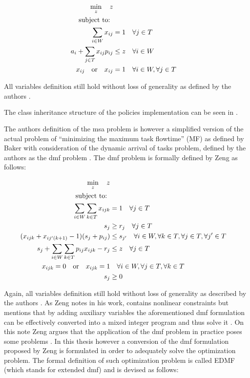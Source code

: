 \documentclass{seal_thesis}
\begin{document}
\begin{align}
    \min_z \quad z\\
    \text{subject to: } \notag \\
    \sum_{i \in W} x_{ij} &= 1 \quad \forall j \in T\\
    a_i + \sum_{j \in T} x_{ij} p_{ij} &\leq z \quad \forall i \in W\\
    x_{ij} \quad \text{or} \quad x_{ij}&=1 \quad \forall i \in W, \forall j \in T
\end{align}

All variables definition still hold without loss of generality as defined by the authors \cite[pp. 5-7]{Zeng2005}.

The class inheritance structure of the policies implementation can be seen in .


The authors definition of the \gls{msa} problem is however a simplified version of the actual problem of ``minimizing the maximum task flowtime'' (MF) as defined by Baker \cite{Baker1974} with consideration of the dynamic arrival of tasks problem, defined by the authors as the \gls{dmf} problem \cite{Zeng2005}. The \gls{dmf} problem is formally defined by Zeng as follows:

\begin{align}
    \min_z \quad z\\
    \text{subject to: } \notag \\
    \sum_{i \in W} \sum_{k \in T} x_{ijk} &= 1 \quad \forall j \in T\\
    s_j &\geq r_j \quad \forall j \in T\\
    (x_{ijk} + x_{ij'(k+1)} - 1)(s_j + p_{ij}) &\leq s_{j'} \quad \forall i \in W, \forall k \in T, \forall j \in T, \forall j' \in T \label{eq:nonlinear_constraints_dmf}\\
    s_j + \sum_{i \in W} \sum_{k \in T} p_{ij} x_{ijk} - r_j &\leq z \quad \forall j \in T\\
    x_{ijk} = 0 \quad \text{or} \quad x_{ijk} = 1 &\quad \forall i \in W, \forall j \in T, \forall k \in T\\
    s_j &\geq 0
\end{align}

Again, all variables definition still hold without loss of generality as described by the authors \cite[p. 6]{Zeng2005}. As Zeng notes in his work,  contains nonlinear constraints but mentions that by adding auxiliary variables the aforementioned \gls{dmf} formulation can be effectively converted into a mixed integer program and thus solve it \cite[p. 6]{Zeng2005}. On this note Zeng argues that the application of the \gls{dmf} problem in practice poses some problems \cite{Zeng2005}. In this thesis however a conversion of the \gls{dmf} formulation proposed by Zeng is formulated in order to adequately solve the optimization problem. The formal definition of such optimization problem is called EDMF (which stands for extended \gls{dmf}) and is devised as follows:
\end{document}
